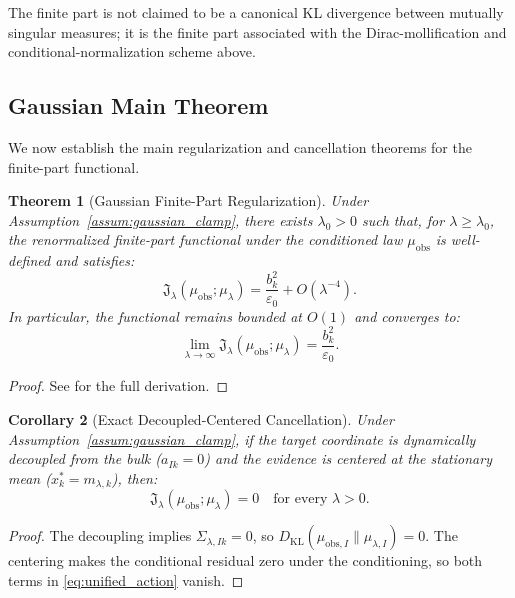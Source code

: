 \documentclass[11pt]{amsart}
\theoremstyle{plain}
\newtheorem{theorem}{Theorem}
\newtheorem{corollary}[theorem]{Corollary}
\theoremstyle{definition}
\theoremstyle{remark}
\newcommand{\KL}{D_{\operatorname{KL}}}
\begin{document}
The finite part is not claimed to be a canonical KL divergence between mutually singular measures; it is the finite part associated with the Dirac-mollification and conditional-normalization scheme above.

\subsection{Gaussian Main Theorem}
\label{sec:gaussian:theorem}

We now establish the main regularization and cancellation theorems for the finite-part functional.

\begin{theorem}[Gaussian Finite-Part Regularization]
  \label{thm:finite_part_regularization}
  Under Assumption~\ref{assum:gaussian_clamp}, there exists $\lambda_0>0$ such that, for $\lambda\ge\lambda_0$, the renormalized finite-part functional under the conditioned law $\mu_{\mathrm{obs}}$ is well-defined and satisfies:
  \begin{equation}
    \label{eq:unified_regularization}
    \mathfrak{J}_\lambda(\mu_{\mathrm{obs}}; \mu_\lambda) = \frac{b_k^2}{\varepsilon_0} + O(\lambda^{-4}).
  \end{equation}
  In particular, the functional remains bounded at $O(1)$ and converges to:
  \begin{equation}
    \lim_{\lambda\to\infty} \mathfrak{J}_\lambda(\mu_{\mathrm{obs}}; \mu_\lambda) = \frac{b_k^2}{\varepsilon_0}.
  \end{equation}
\end{theorem}
\begin{proof}
  See  for the full derivation.
\end{proof}

\begin{corollary}[Exact Decoupled-Centered Cancellation]
  \label{cor:exact_pole_zero}
  Under Assumption~\ref{assum:gaussian_clamp}, if the target coordinate is dynamically decoupled from the bulk ($a_{Ik} = 0$) and the evidence is centered at the stationary mean ($x_k^* = m_{\lambda,k}$), then:
  \begin{equation}
    \mathfrak{J}_\lambda(\mu_{\mathrm{obs}}; \mu_\lambda) = 0 \quad \text{for every } \lambda > 0.
  \end{equation}
\end{corollary}
\begin{proof}
  The decoupling implies $\Sigma_{\lambda,Ik} = 0$, so $\KL(\mu_{\text{obs},I} \parallel \mu_{\lambda,I}) = 0$. The centering makes the conditional residual zero under the conditioning, so both terms in \eqref{eq:unified_action} vanish.
\end{proof}
\end{document}
